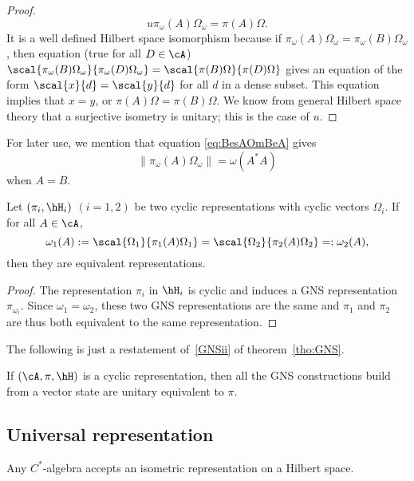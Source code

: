 \begin{proof}
\[
  u\pi_{\omega}(A)\Omega_{\omega}=\pi(A)\Omega.
\]
It is a well defined Hilbert space isomorphism because if $\pi_{\omega}(A)\Omega_{\omega}=\pi_{\omega}(B)\Omega_{\omega}$, then equation (true for all $D\in\cA$) $\scal{\pi_{\omega}(B)\Omega_{\omega}}{\pi_{\omega}(D)\Omega_{\omega}}=\scal{\pi(B)\Omega}{\pi(D)\Omega}$ gives an equation of the form $\scal{x}{d}=\scal{y}{d}$ for all $d$ in a dense subset. This equation implies that $x=y$, or $\pi(A)\Omega=\pi(B)\Omega$. We know from general Hilbert space theory that a surjective isometry is unitary; this is the case of $u$.

\end{proof}

For later use, we mention that equation \eqref{eq:BesAOmBeA} gives
\begin{equation}  \label{eq:piomomaesm}
\| \pi_{\omega}(A)\Omega_{\omega} \|=\omega(A^*A)
\end{equation}
when $A=B$.

\begin{corollary}
Let $(\pi_i,\hH_i)$ $(i=1,2)$ be two cyclic representations with cyclic vectors $\Omega_i$. If for all $A\in\cA$,
\[
  \omega_1(A):=\scal{\Omega_1}{\pi_1(A)\Omega_1}=\scal{\Omega_2}{\pi_2(A)\Omega_2}=:\omega_2(A),
\]
then they are equivalent representations.

\end{corollary}

\begin{proof}
The representation $\pi_i$ in $\hH_i$ is cyclic and induces a GNS representation $\pi_{\omega_i}$. Since $\omega_1=\omega_2$, these two GNS representations are the same and $\pi_1$ and $\pi_2$ are thus both equivalent to the same representation.

\end{proof}

The following is just a restatement of~\ref{GNSii} of theorem~\ref{tho:GNS}.
\begin{proposition}
If $(\cA,\pi,\hH)$ is a cyclic representation, then all the GNS constructions build from a vector state are unitary equivalent to $\pi$. \label{prop:cyclequivGNS}
\end{proposition}


\subsection{Universal representation}

\begin{theorem}
Any $C^*$-algebra accepts an isometric representation on a Hilbert space.
\end{theorem}

